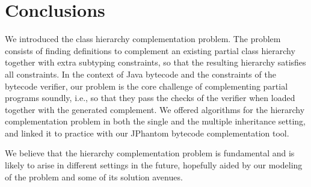 
\section{Conclusions}

We introduced the class hierarchy complementation problem. The problem
consists of finding definitions to complement an existing partial
class hierarchy together with extra subtyping constraints, so that the
resulting hierarchy satisfies all constraints. In the context of Java
bytecode and the constraints of the bytecode verifier, our problem is
the core challenge of complementing partial programs soundly, i.e., so
that they pass the checks of the verifier when loaded together with
the generated complement. We offered algorithms for the hierarchy
complementation problem in both the single and the multiple
inheritance setting, and linked it to practice with our JPhantom
bytecode complementation tool.

We believe that the hierarchy complementation problem is fundamental
and is likely to arise in different settings in the future, hopefully
aided by our modeling of the problem and some of its solution avenues.



